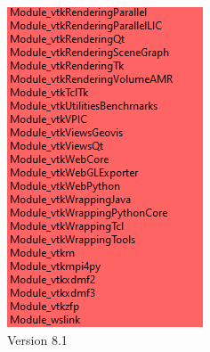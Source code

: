 \begin{figure}
    \centering
    \begin{subfigure}{.45\textwidth}
        \centering
        \includegraphics[width=.7\linewidth]{pictures/Vtk-8.1.0-modules-cmake.PNG}
        \caption{Version 8.1}
        \label{fig:sub1}
    \end{subfigure}
    \begin{subfigure}{.45\textwidth}
        \centering

\end{subfigure}
\end{figure}
